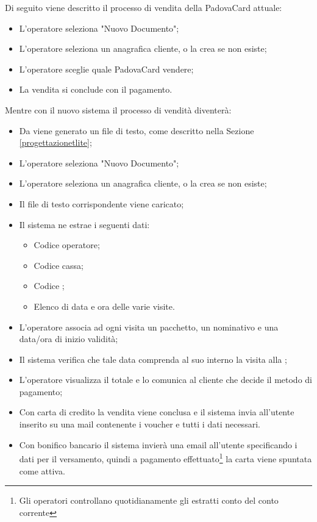 Di seguito viene descritto il processo di vendita della PadovaCard attuale:
\begin{itemize}
\item L'operatore seleziona "Nuovo Documento";
\item L'operatore seleziona un anagrafica cliente, o la crea se non esiste;
\item L'operatore sceglie quale PadovaCard vendere;
\item La vendita si conclude con il pagamento.
\end{itemize}
Mentre con il nuovo sistema il processo di vendità diventerà:
\begin{itemize}
\item Da \tlite viene generato un file di testo, come descritto nella Sezione \ref{progettazionetlite};
\item L'operatore seleziona "Nuovo Documento";
\item L'operatore seleziona un anagrafica cliente, o la crea se non esiste;
\item Il file di testo \tlite corrispondente viene caricato;
\item Il sistema ne estrae i seguenti dati:
	\begin{itemize}
        \item Codice operatore;
        \item Codice cassa;
        \item Codice \tlite;
        \item Elenco di data e ora delle varie visite.
	\end{itemize}
\item L'operatore associa ad ogni visita un pacchetto, un nominativo e una data/ora di inizio validità;
\item Il sistema verifica che tale data comprenda al suo interno la visita alla \cappella;
\item L'operatore visualizza il totale e lo comunica al cliente che decide il metodo di pagamento;
\item Con carta di credito la vendita viene conclusa e il sistema invia all'utente inserito su \tlite una mail contenente i voucher e tutti i dati necessari.
\item Con bonifico bancario il sistema invierà una email all'utente specificando i dati per il versamento, quindi a pagamento effettuato\footnote{Gli operatori controllano quotidianamente gli estratti conto del conto corrente} la carta viene spuntata come attiva.
\end{itemize}

